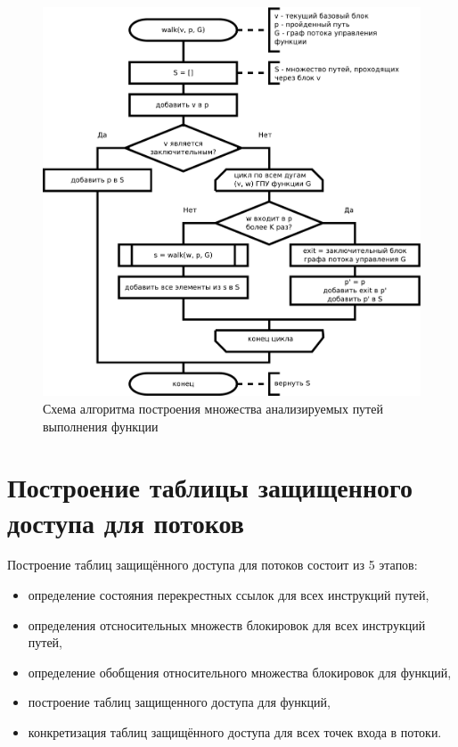 \begin{figure}
  \centering
  \includegraphics[width=\textwidth]{inc/dia/build-pathes}
  \caption{Схема алгоритма построения множества анализируемых путей выполнения функции}
  \label{fig:build-pathes}
\end{figure}
 
\section{Построение таблицы защищенного доступа для потоков}

Построение таблиц защищённого доступа для потоков состоит из 5 этапов:

\begin{itemize}
  \item определение состояния перекрестных ссылок для всех инструкций путей,
  \item определения отсносительных множеств блокировок для всех инструкций путей,
  \item определение обобщения относительного множества блокировок для функций,
  \item построение таблиц защищенного доступа для функций,
  \item конкретизация таблиц защищённого доступа для всех точек входа в потоки.
\end{itemize}

